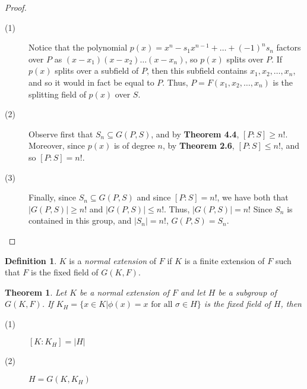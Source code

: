 \documentclass[12pt,leqno]{article}
\numberwithin{equation}{section}
\theoremstyle{plain}
\newtheorem{thm}{Theorem}[section]
\theoremstyle{definition}
\newtheorem*{Def}{Definition}
\theoremstyle{remark}
\begin{document}
\begin{proof}
 \begin{description}
  \item [(1)] Notice that the polynomial $p(x)=x^n-s_1x^{n-1}+\hdots+(-1)^ns_n$ factors over $P$ as $(x-x_1)(x-x_2)\hdots(x-x_n)$, so $p(x)$ splits over $P$. If $p(x)$ splits over a subfield of $P$, then this subfield contains $x_1,x_2,\hdots,x_n$, and so it would in fact be equal to $P$. Thus, $P=F(x_1,x_2,\hdots,x_n)$ is the splitting field of $p(x)$ over $S$.
  \item [(2)] Observe first that $S_n\subseteq G(P,S)$, and by \textbf{Theorem 4.4}, $[P:S]\geq n!$. Moreover, since $p(x)$ is of degree $n$, by \textbf{Theorem 2.6}, $[P:S]\leq n!$, and so $[P:S]=n!$.
  \item [(3)] Finally, since $S_n\subseteq G(P,S)$ and since $[P:S]=n!$, we have both that $|G(P,S)|\geq n!$ and $|G(P,S)|\leq n!$. Thus, $|G(P,S)|=n!$ Since $S_n$ is contained in this group, and $|S_n|=n!$, $G(P,S)=S_n$.\qedhere
 \end{description}
\end{proof}

\begin{Def}
 $K$ is a \textit{normal extension} of $F$ if $K$ is a finite extension of $F$ such that $F$ is the fixed field of $G(K,F)$.
\end{Def}

\begin{thm}
 Let $K$ be a normal extension of $F$ and let $H$ be a subgroup of $G(K,F)$. If $K_H=\{x\in K|\phi(x)=x\text{ for all }\sigma\in H\}$ is the fixed field of $H$, then
\begin{description}
 \item [(1)] $[K:K_H]=|H|$
 \item [(2)] $H=G(K,K_H)$
\end{description}
\end{thm}
\end{document}
